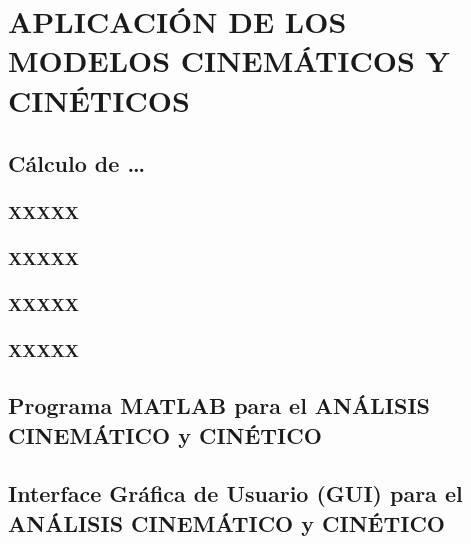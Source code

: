 \section{APLICACIÓN DE LOS MODELOS CINEMÁTICOS Y CINÉTICOS}

\subsection{Cálculo de \ldots}

\subsubsection{XXXXX}

\subsubsection{XXXXX}

\subsubsection{XXXXX}

\subsubsection{XXXXX}

\subsection{Programa MATLAB para el ANÁLISIS CINEMÁTICO y CINÉTICO}

\subsection{Interface Gráfica de Usuario (GUI) para el ANÁLISIS CINEMÁTICO y CINÉTICO}
